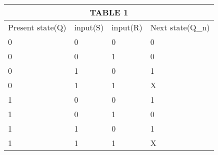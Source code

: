 \documentclass{article}
\begin{document}
\begin{tabular}{ |p{1cm}|p{1cm}|p{1cm}|p{1cm}| }
\hline
\multicolumn{4}{|c|}{TABLE 1} \\
\hline
Present state(Q) & input(S) & input(R) & Next state(Q_n)  \\
\hline
0 & 0 & 0 & 0 \\
\hline
0 & 0 & 1 & 0\\
\hline
0 & 1 & 0 & 1 \\
\hline
0 & 1 & 1 & X  \\
\hline
1 & 0 & 0 & 1 \\
\hline
1 & 0 & 1 & 0 \\
\hline
1 & 1 & 0 & 1 \\
\hline
1 & 1 & 1 & X \\
\hline

\end{tabular}
\end{document}
